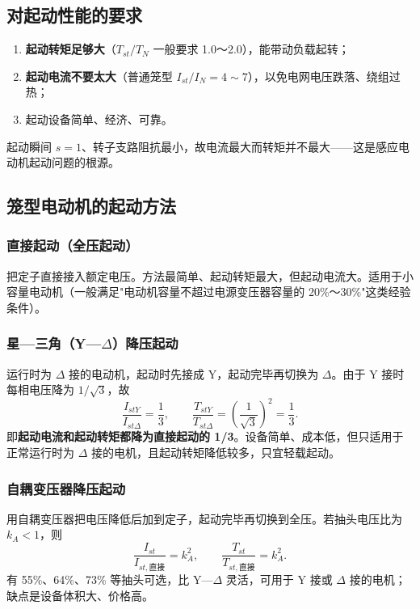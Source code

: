 \subsection{对起动性能的要求}
\begin{enumerate}
  \item \textbf{起动转矩足够大}（$T_{st}/T_N$ 一般要求 1.0～2.0），能带动负载起转；
  \item \textbf{起动电流不要太大}（普通笼型 $I_{st}/I_N=4\sim7$），以免电网电压跌落、绕组过热；
  \item 起动设备简单、经济、可靠。
\end{enumerate}
起动瞬间 $s=1$、转子支路阻抗最小，故电流最大而转矩并不最大——这是感应电动机起动问题的根源。

\subsection{笼型电动机的起动方法}

\subsubsection{直接起动（全压起动）}
把定子直接接入额定电压。方法最简单、起动转矩最大，但起动电流大。适用于小容量电动机（一般满足"电动机容量不超过电源变压器容量的 20\%～30\%"这类经验条件）。

\subsubsection{星—三角（Y—$\Delta$）降压起动}
运行时为 $\Delta$ 接的电动机，起动时先接成 Y，起动完毕再切换为 $\Delta$。由于 Y 接时每相电压降为 $1/\sqrt3$，故
\begin{equation}
\frac{I_{stY}}{I_{st\Delta}}=\frac13,\qquad
\frac{T_{stY}}{T_{st\Delta}}=\left(\frac{1}{\sqrt3}\right)^{2}=\frac13 .
\end{equation}
即\textbf{起动电流和起动转矩都降为直接起动的 1/3}。设备简单、成本低，但只适用于正常运行时为 $\Delta$ 接的电机，且起动转矩降低较多，只宜轻载起动。

\subsubsection{自耦变压器降压起动}
用自耦变压器把电压降低后加到定子，起动完毕再切换到全压。若抽头电压比为 $k_A<1$，则
\begin{equation}
\frac{I_{st}}{I_{st,\text{直接}}}=k_A^{2},\qquad
\frac{T_{st}}{T_{st,\text{直接}}}=k_A^{2} .
\end{equation}
有 55\%、64\%、73\% 等抽头可选，比 Y—$\Delta$ 灵活，可用于 Y 接或 $\Delta$ 接的电机；缺点是设备体积大、价格高。

